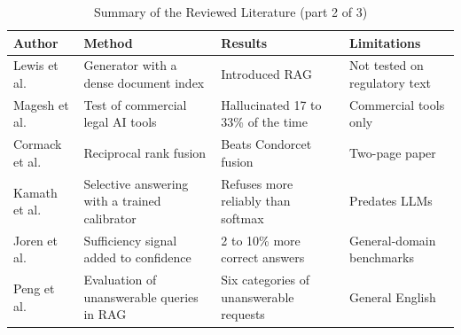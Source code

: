\documentclass{FastFyp}
\begin{document}
\begin{table}[!ht]
\centering
\caption{Summary of the Reviewed Literature (part 2 of 3)}
\small
\setlength{\tabcolsep}{3pt}
\renewcommand{\arraystretch}{1.25}
\begin{tabular}{|p{3cm}|p{4cm}|p{4cm}|p{3cm}|}
\hline
\textbf{Author} & \textbf{Method} & \textbf{Results} & \textbf{Limitations} \\
\hline
Lewis et al. \cite{ref:lewis2020rag} & Generator with a dense document index & Introduced RAG & Not tested on regulatory text \\
\hline
Magesh et al. \cite{ref:magesh2025} & Test of commercial legal AI tools & Hallucinated 17 to 33\% of the time & Commercial tools only \\
\hline
Cormack et al. \cite{ref:cormack2009rrf} & Reciprocal rank fusion & Beats Condorcet fusion & Two-page paper \\
\hline
Kamath et al. \cite{ref:kamath2020selective} & Selective answering with a trained calibrator & Refuses more reliably than softmax & Predates LLMs \\
\hline
Joren et al. \cite{ref:joren2025sufficient} & Sufficiency signal added to confidence & 2 to 10\% more correct answers & General-domain benchmarks \\
\hline
Peng et al. \cite{ref:peng2025unanswerability} & Evaluation of unanswerable queries in RAG & Six categories of unanswerable requests & General English \\
\hline
\end{tabular}
\label{tab:lr-summary-2}
\end{table}
\end{document}
